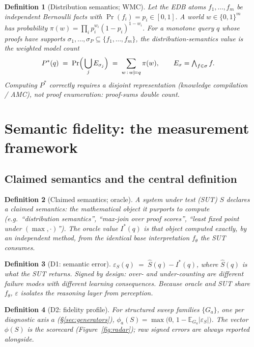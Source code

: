 \documentclass[10pt]{article}
\newtheorem{definition}{Definition}[section]
\theoremstyle{remark}
\newcommand{\eps}{\varepsilon}
\newcommand{\sut}{S}
\begin{document}
\begin{definition}[Distribution semantics; WMC]\label{def:wmc}
Let the EDB atoms $f_1,\dots,f_m$ be independent Bernoulli facts with $\Pr(f_i) = p_i \in [0,1]$.
A \emph{world} $w \in \{0,1\}^m$ has probability $\pi(w) = \prod_i p_i^{w_i}(1-p_i)^{1-w_i}$. For
a monotone query $q$ whose proofs have supports $\sigma_1,\dots,\sigma_P \subseteq
\{f_1,\dots,f_m\}$, the \emph{distribution-semantics value} is the weighted model count
\[
P^*(q) \;=\; \Pr\Bigl(\,\bigcup_{j} E_{\sigma_j}\Bigr)
\;=\; \sum_{w \,:\, w \models q} \pi(w),
\qquad E_\sigma = \textstyle\bigwedge_{f\in\sigma} f .
\]
Computing $P^*$ correctly requires a disjoint representation (knowledge compilation / AMC), not
proof enumeration: proof-sums double count.
\end{definition}

\section{Semantic fidelity: the measurement framework}\label{sec:framework}

\subsection{Claimed semantics and the central definition}

\begin{definition}[Claimed semantics; oracle]\label{def:claimed}
A \emph{system under test} (SUT) $\sut$ declares a \emph{claimed semantics}: the mathematical
object it purports to compute (e.g.\ ``distribution semantics'', ``max-join over proof scores'',
``least fixed point under $(\max,\cdot)$''). The \emph{oracle value} $I^*(q)$ is that object
computed exactly, by an independent method, from the \emph{identical} base interpretation
$f_\theta$ the SUT consumes.
\end{definition}

\begin{definition}[D1: semantic error]\label{def:error}
$\eps_\sut(q) \;=\; \hat\sut(q) - I^*(q)$, where $\hat\sut(q)$ is what the SUT returns. Signed by
design: over- and under-counting are different failure modes with different learning consequences.
Because oracle and SUT share $f_\theta$, $\eps$ isolates the \emph{reasoning} layer from
perception.
\end{definition}

\begin{definition}[D2: fidelity profile]\label{def:profile}
For structured sweep families $\{G_a\}$, one per diagnostic axis $a$ (\S\ref{sec:generators}),
$\phi_a(\sut) = \max\bigl(0,\, 1 - \mathbb{E}_{G_a}\lvert\eps_\sut\rvert\bigr)$. The vector
$\phi(\sut)$ is the scorecard (Figure~\ref{fig:radar}); raw signed errors are always reported
alongside.
\end{definition}
\end{document}
